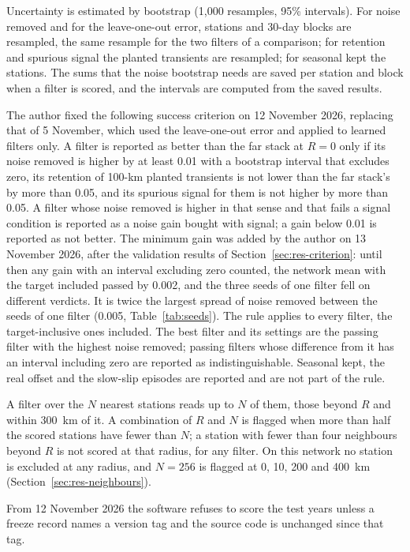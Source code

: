 \documentclass[preprint,12pt,authoryear]{elsarticle}
\begin{document}
Uncertainty is estimated by bootstrap (1,000 resamples, 95\% intervals). For noise removed and for the leave-one-out error, stations and 30-day blocks are resampled, the same resample for the two filters of a comparison; for retention and spurious signal the planted transients are resampled; for seasonal kept the stations. The sums that the noise bootstrap needs are saved per station and block when a filter is scored, and the intervals are computed from the saved results.

The author fixed the following success criterion on 12 November 2026, replacing that of 5 November, which used the leave-one-out error and applied to learned filters only. A filter is reported as better than the far stack at $R = 0$ only if its noise removed is higher by at least 0.01 with a bootstrap interval that excludes zero, its retention of 100-km planted transients is not lower than the far stack's by more than 0.05, and its spurious signal for them is not higher by more than 0.05. A filter whose noise removed is higher in that sense and that fails a signal condition is reported as a noise gain bought with signal; a gain below 0.01 is reported as not better. The minimum gain was added by the author on 13 November 2026, after the validation results of Section~\ref{sec:res-criterion}: until then any gain with an interval excluding zero counted, the network mean with the target included passed by 0.002, and the three seeds of one filter fell on different verdicts. It is twice the largest spread of noise removed between the seeds of one filter (0.005, Table~\ref{tab:seeds}). The rule applies to every filter, the target-inclusive ones included. The best filter and its settings are the passing filter with the highest noise removed; passing filters whose difference from it has an interval including zero are reported as indistinguishable. Seasonal kept, the real offset and the slow-slip episodes are reported and are not part of the rule.

A filter over the $N$ nearest stations reads up to $N$ of them, those beyond $R$ and within 300~km of it. A combination of $R$ and $N$ is flagged when more than half the scored stations have fewer than $N$; a station with fewer than four neighbours beyond $R$ is not scored at that radius, for any filter. On this network no station is excluded at any radius, and $N = 256$ is flagged at 0, 10, 200 and 400~km (Section~\ref{sec:res-neighbours}).

From 12 November 2026 the software refuses to score the test years unless a freeze record names a version tag and the source code is unchanged since that tag.
\end{document}
